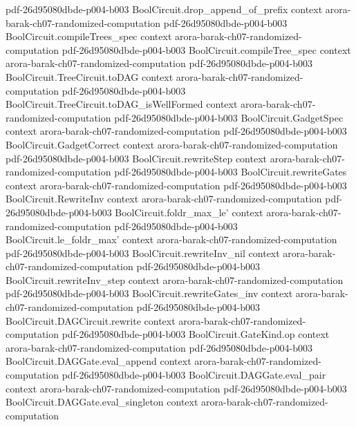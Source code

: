 \begin{theorem}
  {pdf-26d95080dbde-p004-b003}
\proofstep
  {BoolCircuit.drop_append_of_prefix}
  {context}
  {arora-barak-ch07-randomized-computation}
  {pdf-26d95080dbde-p004-b003}
\proofstep
  {BoolCircuit.compileTrees_spec}
  {context}
  {arora-barak-ch07-randomized-computation}
  {pdf-26d95080dbde-p004-b003}
\proofstep
  {BoolCircuit.compileTree_spec}
  {context}
  {arora-barak-ch07-randomized-computation}
  {pdf-26d95080dbde-p004-b003}
\proofstep
  {BoolCircuit.TreeCircuit.toDAG}
  {context}
  {arora-barak-ch07-randomized-computation}
  {pdf-26d95080dbde-p004-b003}
\proofstep
  {BoolCircuit.TreeCircuit.toDAG_isWellFormed}
  {context}
  {arora-barak-ch07-randomized-computation}
  {pdf-26d95080dbde-p004-b003}
\proofstep
  {BoolCircuit.GadgetSpec}
  {context}
  {arora-barak-ch07-randomized-computation}
  {pdf-26d95080dbde-p004-b003}
\proofstep
  {BoolCircuit.GadgetCorrect}
  {context}
  {arora-barak-ch07-randomized-computation}
  {pdf-26d95080dbde-p004-b003}
\proofstep
  {BoolCircuit.rewriteStep}
  {context}
  {arora-barak-ch07-randomized-computation}
  {pdf-26d95080dbde-p004-b003}
\proofstep
  {BoolCircuit.rewriteGates}
  {context}
  {arora-barak-ch07-randomized-computation}
  {pdf-26d95080dbde-p004-b003}
\proofstep
  {BoolCircuit.RewriteInv}
  {context}
  {arora-barak-ch07-randomized-computation}
  {pdf-26d95080dbde-p004-b003}
\proofstep
  {BoolCircuit.foldr_max_le'}
  {context}
  {arora-barak-ch07-randomized-computation}
  {pdf-26d95080dbde-p004-b003}
\proofstep
  {BoolCircuit.le_foldr_max'}
  {context}
  {arora-barak-ch07-randomized-computation}
  {pdf-26d95080dbde-p004-b003}
\proofstep
  {BoolCircuit.rewriteInv_nil}
  {context}
  {arora-barak-ch07-randomized-computation}
  {pdf-26d95080dbde-p004-b003}
\proofstep
  {BoolCircuit.rewriteInv_step}
  {context}
  {arora-barak-ch07-randomized-computation}
  {pdf-26d95080dbde-p004-b003}
\proofstep
  {BoolCircuit.rewriteGates_inv}
  {context}
  {arora-barak-ch07-randomized-computation}
  {pdf-26d95080dbde-p004-b003}
\proofstep
  {BoolCircuit.DAGCircuit.rewrite}
  {context}
  {arora-barak-ch07-randomized-computation}
  {pdf-26d95080dbde-p004-b003}
\proofstep
  {BoolCircuit.GateKind.op}
  {context}
  {arora-barak-ch07-randomized-computation}
  {pdf-26d95080dbde-p004-b003}
\proofstep
  {BoolCircuit.DAGGate.eval_append}
  {context}
  {arora-barak-ch07-randomized-computation}
  {pdf-26d95080dbde-p004-b003}
\proofstep
  {BoolCircuit.DAGGate.eval_pair}
  {context}
  {arora-barak-ch07-randomized-computation}
  {pdf-26d95080dbde-p004-b003}
\proofstep
  {BoolCircuit.DAGGate.eval_singleton}
  {context}
  {arora-barak-ch07-randomized-computation}

\end{theorem}
